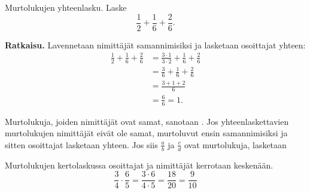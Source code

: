 \begin{esimerkki}
        Murtolukujen yhteenlasku. Laske
        \[
        \frac{1}{2} + \frac{1}{6} + \frac{2}{6}.
        \]
        
        \textbf{Ratkaisu.}
        Lavennetaan nimittäjät samannimisiksi ja lasketaan osoittajat yhteen:
        \begin{align*}
            \frac{1}{2} + \frac{1}{6} + \frac{2}{6} &=\frac{3\cdot 1}{3\cdot 2} + \frac{1}{6} + \frac{2}{6}\\
            										&=\frac{3}{6} + \frac{1}{6} + \frac{2}{6}\\
           											&= \frac{3+1+2}{6}\\
           											&= \frac{6}{6} = 1.
        \end{align*}
    \end{esimerkki}


    Murtolukuja, joiden nimittäjät ovat samat, sanotaan .
    Jos yhteenlaskettavien murtolukujen nimittäjät eivät ole samat, murtoluvut
     ensin samannimisiksi ja sitten osoittajat lasketaan yhteen.
    Jos siis $\frac{a}{b}$ ja $\frac{c}{d}$ ovat murtolukuja, lasketaan


\begin{esimerkki}
        Murtolukujen kertolaskussa osoittajat ja nimittäjät kerrotaan keskenään.
      \[
        \frac{3}{4}\cdot \frac{6}{5}= \frac{3\cdot 6}{4\cdot 5}= \frac{18}{20}=\frac{9}{10}
        \]
    \end{esimerkki}

